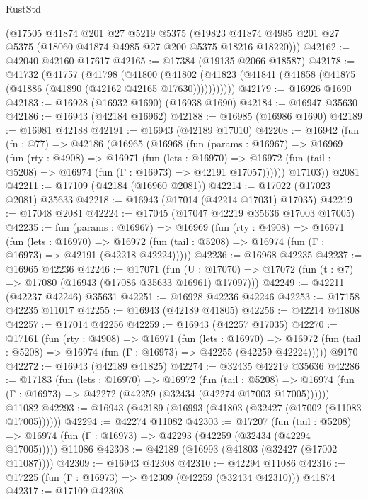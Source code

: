 \begin{lexlean}{RustStd}
\begin{coremodule}
    (@17505
      @41874
      @201
      @27
      @5219
      @5375
      (@19823 @41874 @4985 @201 @27 @5375 (@18060 @41874 @4985 @27 @200 @5375 @18216 @18220)))
@42162 := @42040 @42160 @17617
@42165 := @17384 (@19135 @2066 @18587)
@42178 := @41732
    (@41757
      (@41798
        (@41800
          (@41802 (@41823 (@41841 (@41858 (@41875 (@41886 (@41890 (@42162 @42165 @17630)))))))))))
@42179 := @16926 @1690
@42183 := @16928 (@16932 @1690) (@16938 @1690)
@42184 := @16947 @35630
@42186 := @16943 (@42184 @16962)
@42188 := @16985 (@16986 @1690)
@42189 := @16981 @42188
@42191 := @16943 (@42189 @17010)
@42208 := @16942
    (fun (fn : @77) =>
    @42186
      (@16965
        (@16968
          (fun (params : @16967) =>
          @16969
            (fun (rty : @4908) =>
            @16971
              (fun (lets : @16970) =>
              @16972 (fun (tail : @5208) => @16974 (fun (Γ : @16973) => @42191 @17057))))))
        @17103))
    @2081
@42211 := @17109 (@42184 (@16960 @2081))
@42214 := @17022 (@17023 @2081) @35633
@42218 := @16943 (@17014 (@42214 @17031) @17035)
@42219 := @17048 @2081
@42224 := @17045 (@17047 @42219 @35636 @17003 @17005)
@42235 := fun (params : @16967) =>
  @16969
    (fun (rty : @4908) =>
    @16971
      (fun (lets : @16970) =>
      @16972 (fun (tail : @5208) => @16974 (fun (Γ : @16973) => @42191 (@42218 @42224)))))
@42236 := @16968 @42235
@42237 := @16965 @42236
@42246 := @17071
    (fun (U : @17070) => @17072 (fun (t : @7) => @17080 (@16943 (@17086 @35633 @16961) @17097)))
@42249 := @42211 (@42237 @42246) @35631
@42251 := @16928 @42236 @42246
@42253 := @17158 @42235 @11017
@42255 := @16943 (@42189 @41805)
@42256 := @42214 @41808
@42257 := @17014 @42256
@42259 := @16943 (@42257 @17035)
@42270 := @17161
    (fun (rty : @4908) =>
    @16971
      (fun (lets : @16970) =>
      @16972 (fun (tail : @5208) => @16974 (fun (Γ : @16973) => @42255 (@42259 @42224)))))
    @9170
@42272 := @16943 (@42189 @41825)
@42274 := @32435 @42219 @35636
@42286 := @17183
    (fun (lets : @16970) =>
    @16972
      (fun (tail : @5208) =>
      @16974 (fun (Γ : @16973) => @42272 (@42259 (@32434 (@42274 @17003 @17005))))))
    @11082
@42293 := @16943 (@42189 (@16993 (@41803 (@32427 (@17002 (@11083 @17005))))))
@42294 := @42274 @11082
@42303 := @17207
    (fun (tail : @5208) => @16974 (fun (Γ : @16973) => @42293 (@42259 (@32434 (@42294 @17005)))))
    @11086
@42308 := @42189 (@16993 (@41803 (@32427 (@17002 @11087))))
@42309 := @16943 @42308
@42310 := @42294 @11086
@42316 := @17225 (fun (Γ : @16973) => @42309 (@42259 (@32434 @42310))) @41874
@42317 := @17109 @42308

\end{coremodule}
\end{lexlean}
